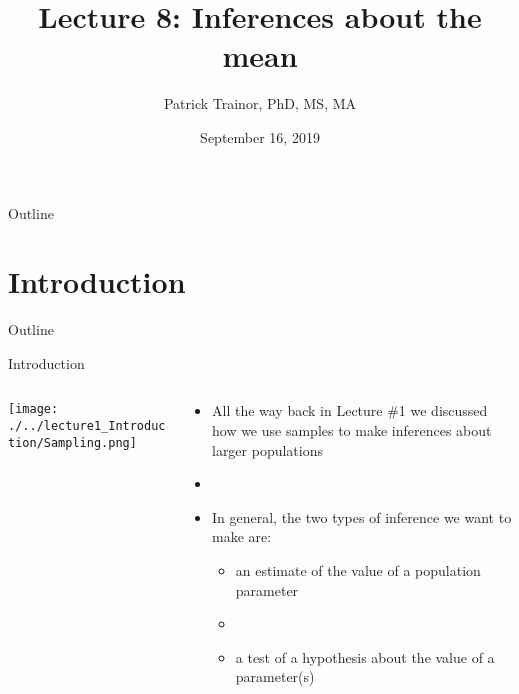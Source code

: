\documentclass[xcolor=dvipsnames]{beamer}
\title[Lecture 8]{Lecture 8: Inferences about the mean}
\author[Patrick Trainor]{Patrick Trainor, PhD, MS, MA}
\institute[NMSU]{New Mexico State University}
\date{September 16, 2019}
\begin{document}
\begin{frame}
	\maketitle
\end{frame}

\begin{frame}{Outline}
	\tableofcontents[hideallsubsections]
\end{frame}

\section{Introduction}
\begin{frame}{Outline}
	\tableofcontents[currentsection,subsectionstyle=show/shaded/hide]
\end{frame}

\begin{frame}{Introduction}
	\begin{columns}
		\begin{column}{.4 \textwidth}
			\begin{center}
				\texttt{[image: ./../lecture1\_Introduction/Sampling.png]}
				\end{center}
		\end{column}
		\begin{column}{.5 \textwidth}
				\begin{itemize}
				\item All the way back in Lecture \#1 we discussed how we use samples to make inferences about larger populations
				\item[]
				\item In general, the two types of inference we want to make are:
				\begin{itemize}
					\item an estimate of the value of a population parameter 
					\item[]
					\item a test of a hypothesis about the value of a parameter(s)
				\end{itemize}
			\end{itemize}
		\end{column}
	\end{columns}
\end{frame}
\end{document}
